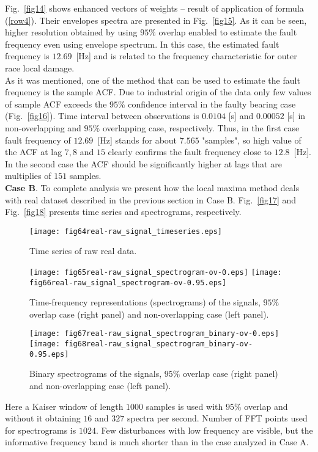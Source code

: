 \documentclass[3p,times]{elsarticle}
\begin{document}
Fig.~\ref{fig14} shows enhanced vectors of weights -- result of application of formula (\ref{row4}). Their envelopes spectra are presented in Fig.~\ref{fig15}. As it can be seen, higher resolution obtained by using $95\%$ overlap enabled to estimate the fault frequency even using envelope spectrum. In this case, the estimated fault frequency is $12.69$~[Hz] and is related to the frequency characteristic for outer race local damage.\\
As it was mentioned, one of the  method that can be used to estimate the fault frequency is the sample ACF. Due to industrial origin of the data only few values of sample ACF exceeds the $95\%$ confidence interval in the faulty bearing case (Fig.~\ref{fig16}). Time interval between observations is $0.0104$ [s] and $0.00052$ [s] in non-overlapping and $95\%$ overlapping case, respectively. Thus, in the first case fault frequency of $12.69$~[Hz] stands for about $7.565$ "samples", so high value of the ACF at lag $7, 8$ and $15$ clearly confirms the fault frequency close to $12.8$~[Hz]. In the second case the ACF should be significantly higher at lags that are multiplies of $151$ samples.\\
\textbf{Case B}. To complete analysis we present how the local maxima method deals with real dataset described in the previous section in Case B.  Fig.~\ref{fig17} and Fig.~\ref{fig18} presents time series and spectrograms, respectively.\\
\begin{figure}[ht]
\begin{center}
\texttt{[image: fig64real-raw\_signal\_timeseries.eps]}
\caption{Time series of raw real data.}
\label{fig17}
\texttt{[image: fig65real-raw\_signal\_spectrogram-ov-0.eps]}
\texttt{[image: fig66real-raw\_signal\_spectrogram-ov-0.95.eps]}
\caption{Time-frequency representations (spectrograms) of the signals, $95\%$ overlap case (right panel) and non-overlapping case (left panel).}
\label{fig18}
\texttt{[image: fig67real-raw\_signal\_spectrogram\_binary-ov-0.eps]}
\texttt{[image: fig68real-raw\_signal\_spectrogram\_binary-ov-0.95.eps]}
\caption{Binary spectrograms of the signals, $95\%$ overlap case (right panel) and non-overlapping case (left panel).}\label{fig19}
\end{center}
\end{figure}
Here a Kaiser window of length $1000$ samples is used with $95\%$ overlap and without it obtaining $16$ and $327$ spectra per second. Number of FFT points used for spectrograms is $1024$. Few disturbances with low frequency are visible, but the informative frequency band is much shorter than in the case analyzed in Case A.\\
\end{document}
